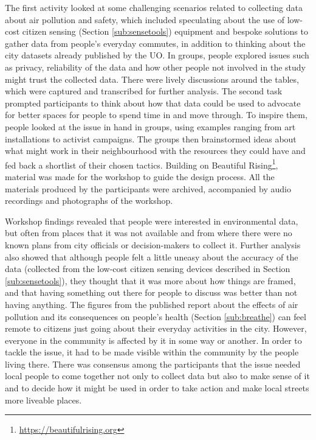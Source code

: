 The first activity looked at some challenging scenarios related to collecting data about air pollution and safety, which included speculating about the use of low-cost citizen sensing (Section \ref{sub:sensetools}) equipment and bespoke solutions \citep{maskell_spokespeople:_2018} to gather data from people's everyday commutes, in addition to thinking about the city datasets already published by the UO. In groups, people explored issues such as privacy, reliability of the data and how other people not involved in the study might trust the collected data. There were lively discussions around the tables, which were captured and transcribed for further analysis. The second task prompted participants to think about how that data could be used to advocate for better spaces for people to spend time in and move through. To inspire them, people looked at the issue in hand in groups, using examples ranging from art installations to activist campaigns. The groups then brainstormed ideas about what might work in their neighbourhood with the resources they could have and fed back a shortlist of their chosen tactics. Building on Beautiful Rising\footnote{\url{https://beautifulrising.org}}, material was made for the workshop to guide the design process. All the materials produced by the participants were archived, accompanied by audio recordings and photographs of the workshop.

Workshop findings revealed that people were interested in environmental data, but often from places that it was not available and from where there were no known plans from city officials or decision-makers to collect it. Further analysis also showed that although people felt a little uneasy about the accuracy of the data (collected from the low-cost citizen sensing devices described in Section \ref{sub:sensetools}), they thought that it was more about how things are framed, and that having something out there for people to discuss was better than not having anything. The figures from the published report about the effects of air pollution and its consequences on people's health (Section \ref{sub:breathe}) can feel remote to citizens just going about their everyday activities in the city. However, everyone in the community is affected by it in some way or another. In order to tackle the issue, it had to be made visible within the community by the people living there. There was consensus among the participants that the issue needed local people to come together not only to collect data but also to make sense of it and to decide how it might be used in order to take action and make local streets more liveable places.

